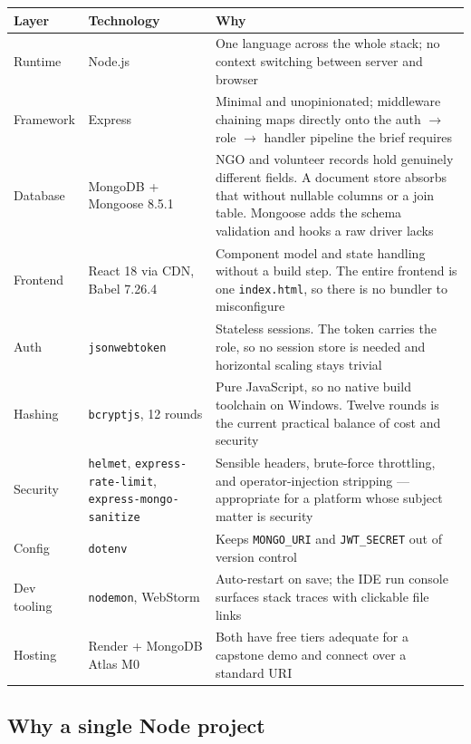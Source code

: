\documentclass[11pt,letterpaper]{article}
\begin{document}
\begin{center}
\begin{tabularx}{\textwidth}{@{}L{2.2cm} L{3.4cm} X@{}}
\toprule
\textbf{Layer} & \textbf{Technology} & \textbf{Why}\\
\midrule
Runtime & Node.js &
One language across the whole stack; no context switching between server and browser\\
\addlinespace
Framework & Express &
Minimal and unopinionated; middleware chaining maps directly onto the
auth $\rightarrow$ role $\rightarrow$ handler pipeline the brief requires\\
\addlinespace
Database & MongoDB + Mongoose 8.5.1 &
NGO and volunteer records hold genuinely different fields. A document store
absorbs that without nullable columns or a join table. Mongoose adds the
schema validation and hooks a raw driver lacks\\
\addlinespace
Frontend & React 18 via CDN, Babel 7.26.4 &
Component model and state handling without a build step. The entire frontend
is one \texttt{index.html}, so there is no bundler to misconfigure\\
\addlinespace
Auth & \texttt{jsonwebtoken} &
Stateless sessions. The token carries the role, so no session store is needed
and horizontal scaling stays trivial\\
\addlinespace
Hashing & \texttt{bcryptjs}, 12 rounds &
Pure JavaScript, so no native build toolchain on Windows. Twelve rounds is the
current practical balance of cost and security\\
\addlinespace
Security & \texttt{helmet}, \texttt{express-rate-limit}, \texttt{express-mongo-sanitize} &
Sensible headers, brute-force throttling, and operator-injection stripping ---
appropriate for a platform whose subject matter is security\\
\addlinespace
Config & \texttt{dotenv} &
Keeps \texttt{MONGO\_URI} and \texttt{JWT\_SECRET} out of version control\\
\addlinespace
Dev tooling & \texttt{nodemon}, WebStorm &
Auto-restart on save; the IDE run console surfaces stack traces with
clickable file links\\
\addlinespace
Hosting & Render + MongoDB Atlas M0 &
Both have free tiers adequate for a capstone demo and connect over a
standard URI\\
\bottomrule
\end{tabularx}
\end{center}

\subsection{Why a single Node project}
\end{document}
